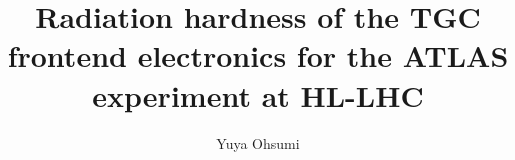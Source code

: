 \documentclass[final,5p,times]{elsarticle}
\begin{document}
\begin{frontmatter}



\title{Radiation hardness of the TGC frontend electronics for the ATLAS experiment at HL-LHC}


\author{Yuya Ohsumi}



\end{frontmatter}
\end{document}
